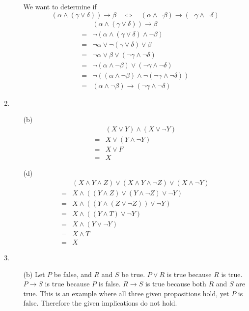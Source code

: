 \documentclass[fleqn]{article}
\begin{document}
\begin{enumerate}
\begin{enumerate}
		We want to determine if
		\[(\alpha \land (\gamma \lor \delta)) \rightarrow \beta \quad \Leftrightarrow \quad (\alpha \land \lnot \beta) \rightarrow (\lnot \gamma \land \lnot \delta)\]
		\begin{align*}
			&(\alpha \land (\gamma \lor \delta)) \rightarrow \beta \\
			= &\lnot (\alpha \land (\gamma \lor \delta) \land \lnot \beta) \\
			= &\lnot \alpha \lor \lnot (\gamma \lor \delta) \lor \beta \\
			= &\lnot \alpha \lor \beta \lor (\lnot \gamma \land \lnot \delta) \\
			= &\lnot (\alpha \land \lnot \beta) \lor (\lnot \gamma \land \lnot \delta) \\
			= &\lnot ((\alpha \land \lnot \beta) \land \lnot (\lnot \gamma \land \lnot \delta)) \\
			= &(\alpha \land \lnot \beta) \rightarrow (\lnot \gamma \land \lnot \delta)
		\end{align*}
		
	\end{enumerate}

	\item %
	\begin{enumerate}
		\item[(b)]
		\begin{align*}
			&(X \lor Y) \land (X \lor \lnot Y) \\
			= &X \lor (Y \land \lnot Y) \\
			= &X \lor F \\
			= &X
		\end{align*}

		\item[(d)]
		\begin{align*}
			&(X \land Y \land Z) \lor (X \land Y \land \lnot Z) \lor (X \land \lnot Y) \\
			= &X \land ((Y \land Z) \lor (Y \land \lnot Z) \lor \lnot Y) \\
			= &X \land ((Y \land (Z \lor \lnot Z)) \lor \lnot Y) \\
			= &X \land ((Y \land T) \lor \lnot Y) \\
			= &X \land (Y \lor \lnot Y) \\
			= &X \land T \\
			= &X
		\end{align*}
	\end{enumerate}

	\item %
	\begin{enumerate}
		\item[(b)]
		Let \(P\) be false, and \(R\) and \(S\) be true. \(P \lor R\) is true because \(R\) is true. \(P \rightarrow S\) is true because \(P\) is false. \(R \rightarrow S\) is true because both \(R\) and \(S\) are true. This is an example where all three given propositions hold, yet \(P\) is false. Therefore the given implications do not hold.
		

\end{enumerate}
\end{enumerate}
\end{document}
